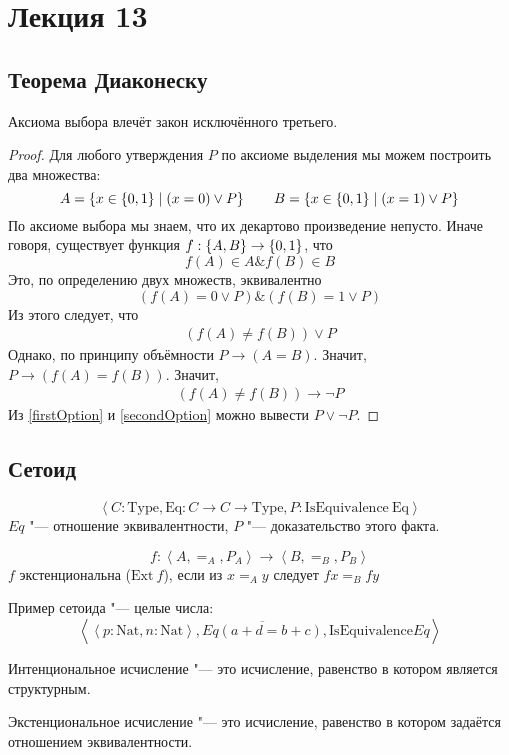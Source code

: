 \section{Лекция 13}

\subsection{Теорема Диаконеску}
\begin{theorem}[Диаконеску]
    Аксиома выбора влечёт закон исключённого третьего.
\end{theorem}

\begin{proof}

Для любого утверждения $P$ по аксиоме выделения мы можем построить два множества:
\[
    A = \left\{x \in \left\{0, 1\right\} \mid \left(x = 0\right) \lor P\right\} \qquad
    B = \left\{x \in \left\{0, 1\right\} \mid \left(x = 1\right) \lor P\right\}
\]
По аксиоме выбора мы знаем, что их декартово произведение непусто.
Иначе говоря, существует функция $f : \left\{A, B\right\} \to \left\{0, 1\right\}$, что
\[
    f(A) \in A \& f(B) \in B
\]
Это, по определению двух множеств, эквивалентно
\[
    \left(f(A) = 0 \vee P\right) \& \left(f(B) = 1 \vee P\right)
\]
Из этого следует, что
\begin{gather}
    \left(f(A) \neq f(B)\right) \vee P \label{firstOption} \tag{$*$}
\end{gather}
Однако, по принципу объёмности $P \to \left(A=B\right)$. Значит, $P \to \left(f(A) = f(B)\right)$. Значит,
\begin{gather}
    \left(f(A) \neq f(B)\right) \to \neg P \label{secondOption} \tag{$**$}
\end{gather}
Из \ref{firstOption} и \ref{secondOption} можно вывести $P \vee \neg P$.

\end{proof}

\subsection{Сетоид}
\begin{definition}[Сетоид]
    \[
        \left<C : \mathrm{Type}, \mathrm{Eq} : C \to C \to \mathrm{Type}, P : \mathrm{IsEquivalence}~\mathrm{Eq}\right>
    \]
    $Eq$ "--- отношение эквивалентности, $P$ "--- доказательство этого факта.
\end{definition}
\begin{definition}[Экстенциональность]
    \[
        f : \left< A, =_A, P_A\right> \to \left<B, =_B, P_B\right>
    \]
    $f$ экстенциональна ($\mathrm{Ext}~f$), если из $x =_A y$ следует $f x =_B f y$
\end{definition}

Пример сетоида "--- целые числа:
\[
    \left< \left<p : \mathrm{Nat}, n : \mathrm{Nat}\right>, \overline{Eq(a+d=b+c)}, \mathrm{IsEquivalence} Eq\right>
\]


Интенциональное исчисление "--- это исчисление, равенство в котором является структурным.

Экстенциональное исчисление "--- это исчисление, равенство в котором задаётся отношением эквивалентности.